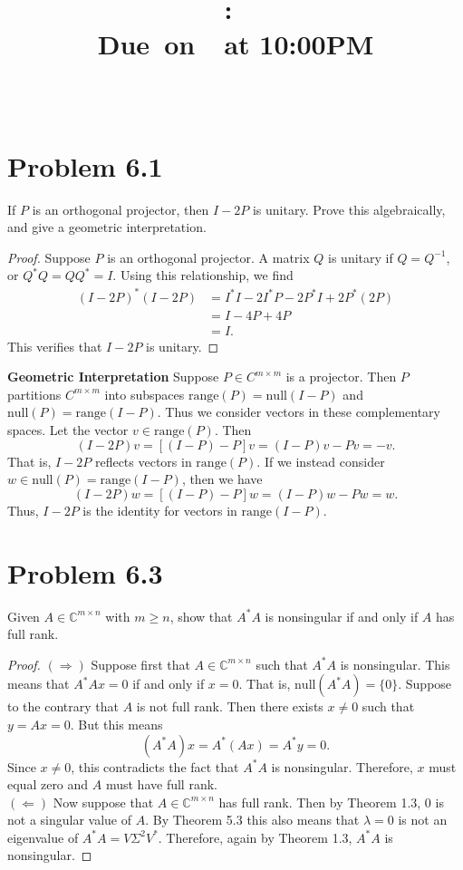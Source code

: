 \documentclass{article}
\title{
    \vspace{2in}
    \textmd{\textbf{\hmwkClass:\ \hmwkTitle}}\\
    \normalsize\vspace{0.1in}\small{Due\ on\ \hmwkDueDate\ at 10:00PM}\\
    \vspace{0.1in}\large{\textit{\hmwkClassInstructor\ \hmwkClassTime}}
    \vspace{3in}
}
\author{\hmwkAuthorName}
\date{}
\begin{document}
\maketitle

\pagebreak
\section*{Problem 6.1}
If $P$ is an orthogonal projector, then $I - 2P$ is unitary. Prove this algebraically, and give a geometric interpretation.

\begin{proof}
    Suppose $P$ is an orthogonal projector. A matrix $Q$ is unitary if $Q = Q^{-1}$, or $Q^*Q = QQ^* = I$. Using this relationship, we find
    \begin{align}
        (I - 2P)^*(I - 2P) &= I^*I - 2I^*P - 2P^*I + 2P^*(2P)\\
        &= I - 4P + 4P\\
        &= I.
    \end{align}
    This verifies that $I - 2P$ is unitary. 
\end{proof}

\textbf{Geometric Interpretation}
Suppose $P \in C^{m \times m}$ is a projector. Then $P$ partitions $C^{m \times m}$ into subspaces $\text{range}(P) = \text{null}(I-P)$ and $\text{null}(P) = \text{range}(I-P)$. Thus we consider vectors in these complementary spaces. Let the vector $v \in \text{range}(P)$. Then \[(I - 2P)v = [(I-P) - P]v = (I-P)v - Pv = -v.\] That is, $I-2P$ reflects vectors in $\text{range}(P)$. If we instead consider $w \in \text{null}(P) = \text{range}(I - P)$, then we have \[(I - 2P)w = [(I-P) - P]w = (I-P)w - Pw = w. \] Thus, $I - 2P$ is the identity for vectors in $\text{range}(I - P)$.


\pagebreak
\section*{Problem 6.3}
Given $A \in \mathbb{C}^{m \times n}$ with $m \geq n$, show that $A^*A$ is nonsingular if and only if $A$ has full rank.\\

\begin{proof}
    $(\Rightarrow)$ Suppose first that $A \in \mathbb{C}^{m \times n}$ such that $A^*A$ is nonsingular. This means that $A^*Ax = 0$ if and only if $x = 0$. That is, $\text{null}(A^*A) = \{0\}$. Suppose to the contrary that $A$ is not full rank. Then there exists $x \neq 0$ such that $y = Ax = 0$. But this means \[(A^*A)x = A^*(Ax) = A^*y = 0. \] Since $x \neq 0$, this contradicts the fact that $A^*A$ is nonsingular. Therefore, $x$ must equal zero and $A$ must have full rank.\\

    $(\Leftarrow)$ Now suppose that $A \in \mathbb{C}^{m \times n}$ has full rank. Then by Theorem 1.3, $0$ is not a singular value of $A$. By Theorem 5.3 this also means that $\lambda = 0$ is not an eigenvalue of $A^*A = V\Sigma^2V^*$. Therefore, again by Theorem 1.3, $A^*A$ is nonsingular.  

\end{proof}
\end{document}
